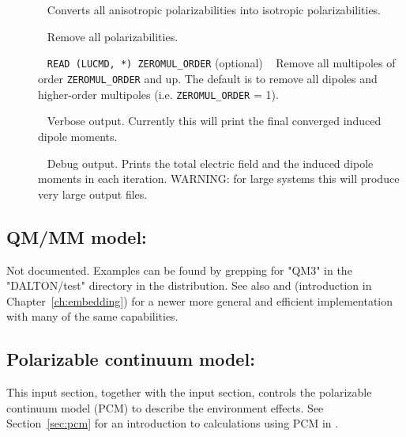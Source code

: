 \begin{description}
\item[]\verb| |\newline
Converts all anisotropic polarizabilities into isotropic polarizabilities.

\item[]\verb| |\newline
Remove all polarizabilities.

\item[]\verb| |\newline
\verb|READ (LUCMD, *) ZEROMUL_ORDER| (optional) \verb| |\newline
Remove all multipoles of order \verb|ZEROMUL_ORDER| and up. The default is to remove all dipoles and higher-order multipoles (i.e. \verb|ZEROMUL_ORDER| = 1).

\item[]\verb| |\newline
Verbose output. Currently this will print the final converged induced dipole moments.

\item[]\verb| |\newline
Debug output. Prints the total electric field and the induced dipole moments in each iteration. WARNING: for large systems this will produce very large output files.

\end{description}

\subsection{QM/MM model: }
\label{sec:qm3}

Not documented. Examples can be found by grepping for "QM3" in the "DALTON/test" directory in the distribution. See also  and  
(introduction in Chapter~\ref{ch:embedding}) for a newer more general and efficient implementation with many of the same capabilities.

\subsection{Polarizable continuum model: }
\label{subsec:pcm}

This input section, together with the  input section,
controls the polarizable continuum model (PCM) to describe the
environment effects. See Section~\ref{sec:pcm} for an introduction to
calculations using PCM in {\dalton}.

